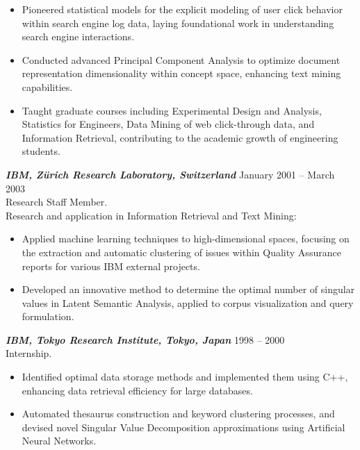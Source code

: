 \documentclass[10pt]{res} %
\begin{document}
\begin{resume}
\begin{itemize}
\item Pioneered statistical models for the explicit modeling of user
  click behavior within search engine log data, laying foundational
  work in understanding search engine interactions.
  
\item Conducted advanced Principal Component Analysis to optimize
  document representation dimensionality within concept space,
  enhancing text mining capabilities.
  
\item Taught graduate courses including Experimental Design and
  Analysis, Statistics for Engineers, Data Mining of web click-through
  data, and Information Retrieval, contributing to the academic growth
  of engineering students.
\end{itemize}

{\sl \textbf{IBM, Z\"urich Research Laboratory, Switzerland}} \hfill January 2001 -- March 2003 \\
Research Staﬀ Member.\\
Research and application in Information Retrieval and Text Mining:

\vspace{8pt}

\begin{itemize}
\item Applied machine learning techniques to high-dimensional spaces,
  focusing on the extraction and automatic clustering of issues within
  Quality Assurance reports for various IBM external projects.
 
\item Developed an innovative method to determine the optimal number
  of singular values in Latent Semantic Analysis, applied to corpus
  visualization and query formulation.
\end{itemize}

{\sl \textbf{IBM, Tokyo Research Institute, Tokyo, Japan}} \hfill 1998 -- 2000 \\
Internship.\\ 

\vspace{8pt}

\begin{itemize}
\item Identified optimal data storage methods and implemented them
  using C++, enhancing data retrieval efficiency for large databases.
  
\item Automated thesaurus construction and keyword clustering
  processes, and devised novel Singular Value Decomposition
  approximations using Artificial Neural Networks.
\end{itemize}


\end{resume}
\end{document}
